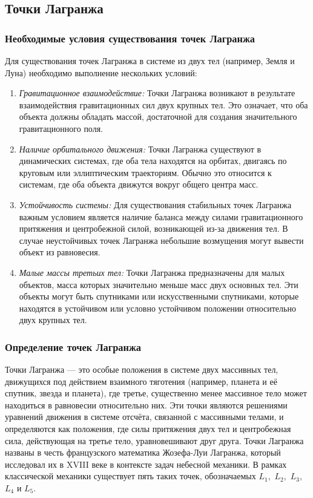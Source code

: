 \documentclass[a4paper,12pt]{article}
\begin{document}
\subsection{Точки Лагранжа}

\subsubsection{Необходимые условия существования точек Лагранжа}
Для существования точек Лагранжа в системе из двух тел (например, Земля и Луна) необходимо выполнение нескольких условий:
\begin{enumerate}
\item \textit{Гравитационное взаимодействие:} Точки Лагранжа возникают в результате взаимодействия гравитационных сил двух крупных тел.
Это означает, что оба объекта должны обладать массой, достаточной для создания значительного гравитационного поля.
\item \textit{Наличие орбитального движения:} Точки Лагранжа существуют в динамических системах,
где оба тела находятся на орбитах, двигаясь по круговым или эллиптическим траекториям.
Обычно это относится к системам, где оба объекта движутся вокруг общего центра масс.
\item \textit{Устойчивость системы:} Для существования стабильных точек Лагранжа важным условием является наличие баланса между силами гравитационного притяжения и
центробежной силой, возникающей из-за движения тел.
В случае неустойчивых точек Лагранжа небольшие возмущения могут вывести объект из равновесия.
\item \textit{Малые массы третьих тел:} Точки Лагранжа предназначены для малых объектов, масса которых значительно меньше масс двух основных тел.
Эти объекты могут быть спутниками или искусственными спутниками, которые находятся в устойчивом или условно устойчивом положении относительно двух крупных тел.
\end{enumerate}                

\subsubsection{Определение точек Лагранжа}
Точки Лагранжа — это особые положения в системе двух массивных тел, движущихся под действием взаимного тяготения (например, планета и её спутник, звезда и планета),
где третье, существенно менее массивное тело может находиться в равновесии относительно них.
Эти точки являются решениями уравнений движения в системе отсчёта, связанной с массивными телами,
и определяются как положения, где силы притяжения двух тел и центробежная сила, действующая на третье тело, уравновешивают друг друга.
Точки Лагранжа названы в честь французского математика Жозефа-Луи Лагранжа, который исследовал их в XVIII веке в контексте задач небесной механики.
В рамках классической механики существует пять таких точек, обозначаемых $L_1,$ $L_2,$ $L_3,$ $L_4$ и $L_5.$ 
\end{document}
